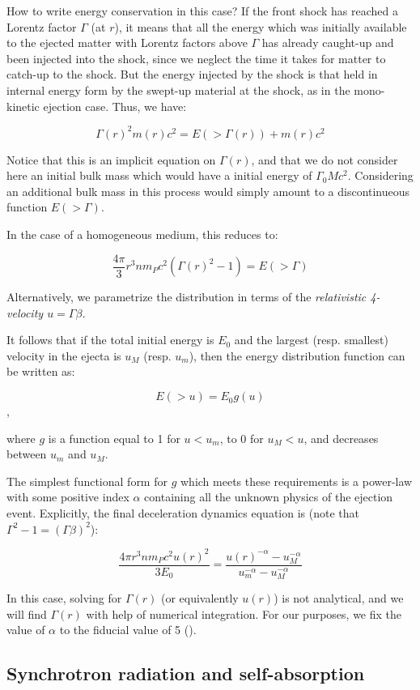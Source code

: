 How to write energy conservation in this case? If the front shock has reached a Lorentz factor $\Gamma$ (at $r$), it means that all the energy which was initially available to the ejected matter with Lorentz factors above $\Gamma$ has already caught-up and been injected into the shock, since we neglect the time it takes for matter to catch-up to the shock. But the energy injected by the shock is that held in internal energy form by the swept-up material at the shock, as in the mono-kinetic ejection case. Thus, we have:

$$ \Gamma(r)^2 m(r) c ^ 2 = E( > \Gamma(r)) + m(r) c ^ 2$$

Notice that this is an implicit equation on $\Gamma(r)$, and that we do not consider here an initial bulk mass which would have a initial energy of $\Gamma_0 M c^2$. Considering an additional bulk mass in this process would simply amount to a discontinueous function $ E( > \Gamma)$.

In the case of a homogeneous medium, this reduces to:

$$\frac{4\pi}{3}r^3 n m_P c^2(\Gamma(r)^2 - 1) = E( > \Gamma) $$


Alternatively, we parametrize the distribution in terms of the \it{relativistic 4-velocity} $u = \Gamma \beta$.

It follows that if the total initial energy is $E_0$ and the largest (resp. smallest) velocity in the ejecta is $u_M$ (resp. $u_m$), then the energy distribution function can be written as:

$$ E( > u) = E_0 g(u) $$,

where $g$ is a function equal to 1 for $u < u_m$, to 0 for $u_M < u$, and decreases between $u_m$ and $u_M$.

The simplest functional form for $g$ which meets these requirements is a power-law with some positive index $\alpha$  containing all the unknown physics of the ejection event. Explicitly, the final deceleration dynamics equation is (note that $\Gamma^2 - 1 = (\Gamma\beta)^2$):

$$\frac{4\pi r^3 n m_P c^2u(r)^2}{3 E_0} = \frac{u(r) ^ {-\alpha} - u_M^{-\alpha}}{u_m ^ {-\alpha} - u_M ^ {-\alpha}} $$

In this case, solving for $\Gamma(r)$ (or equivalently $u(r)$) is not analytical, and we will find $\Gamma(r)$ with help of numerical integration. For our purposes, we fix the value of $\alpha$ to the fiducial value of 5 (\cite{13}).

\subsection{Synchrotron radiation and self-absorption}

